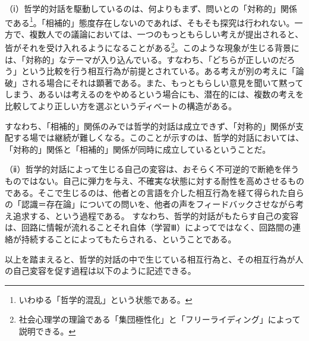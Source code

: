 \documentclass[b5j,twoside,twocolumn]{utarticle}
\begin{document}
（ⅰ）哲学的対話を駆動しているのは、何よりもまず、問いとの「対称的」関係である\footnote{いわゆる「哲学的混乱」という状態である。}。「相補的」態度存在しないのであれば、そもそも探究は行われない。一方で、複数人での議論においては、一つのもっともらしい考えが提出されると、皆がそれを受け入れるようになることがある\footnote{社会心理学の理論である「集団極性化」と「フリーライディング」によって説明できる。}。このような現象が生じる背景には、「対称的」なテーマが入り込んでいる。すなわち、「どちらが正しいのだろう」という比較を行う相互行為が前提とされている。ある考えが別の考えに「論破」される場合にそれは顕著である。また、もっともらしい意見を聞いて黙ってしまう、あるいは考えるのをやめるという場合にも、潜在的には、複数の考えを比較してより正しい方を選ぶというディベートの構造がある。


すなわち、「相補的」関係のみでは哲学的対話は成立できず、「対称的」関係が支配する場では継続が難しくなる。このことが示すのは、哲学的対話においては、「対称的」関係と「相補的」関係が同時に成立しているということだ。


（ⅱ）哲学的対話によって生じる自己の変容は、おそらく不可逆的で断絶を伴うものではない。自己に弾力を与え、不確実な状態に対する耐性を高めさせるものである。そこで生じるのは、他者との言語を介した相互行為を経て得られた自らの「認識＝存在論」についての問いを、他者の声をフィードバックさせながら考え追求する、という過程である。%
すなわち、哲学的対話がもたらす自己の変容は、回路に情報が流れることそれ自体（学習Ⅲ）によってではなく、回路間の連絡が持続することによってもたらされる、ということである。


以上を踏まえると、哲学的対話の中で生じている相互行為と、その相互行為が人の自己変容を促す過程は以下のように記述できる。
\end{document}
